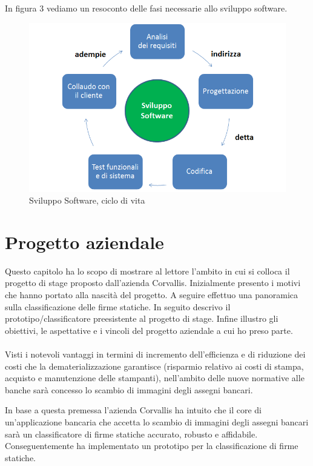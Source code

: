 In figura 3 vediamo un resoconto delle fasi necessarie allo sviluppo software.
\begin{figure}[H]
\centering
\includegraphics[scale=0.55]{../Logo&Header/sviluppoSoftware.png}
\caption{ Sviluppo Software, ciclo di vita}
\end{figure}

\newpage
\newpage

\section{Progetto aziendale}
\label{2.0}
Questo capitolo ha lo scopo di mostrare al lettore l'ambito in cui si colloca il progetto di stage proposto dall'azienda Corvallis. Inizialmente presento i motivi che hanno portato alla nascità del progetto. A seguire effettuo una panoramica sulla classificazione delle firme statiche. In seguito descrivo il prototipo/classificatore preesistente al progetto di stage. Infine illustro gli obiettivi, le aspettative e i vincoli del progetto aziendale a cui ho preso parte.\\\\
Visti i notevoli vantaggi in termini di incremento dell'efficienza e di riduzione dei costi che la \gls{dematerializzazione} garantisce (risparmio relativo ai costi di stampa, acquisto e manutenzione delle stampanti), nell'ambito delle nuove normative alle banche sarà concesso lo scambio di immagini degli assegni bancari. 

In base a questa premessa l'azienda Corvallis ha intuito che il core di un'applicazione bancaria che accetta lo scambio di immagini degli assegni bancari sarà un classificatore di firme statiche accurato, robusto e affidabile. Conseguentemente ha implementato un prototipo per la classificazione di firme statiche.


